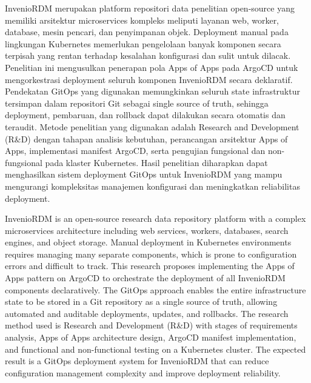 \documentclass[proposal,indonesia]{ugmskripsi}
\begin{document}
\cover
\titlepageind
\approvalpage

\tableofcontents

\abstractind
InvenioRDM merupakan platform repositori data penelitian open-source yang memiliki arsitektur microservices kompleks meliputi layanan web, worker, database, mesin pencari, dan penyimpanan objek. Deployment manual pada lingkungan Kubernetes memerlukan pengelolaan banyak komponen secara terpisah yang rentan terhadap kesalahan konfigurasi dan sulit untuk dilacak. Penelitian ini mengusulkan penerapan pola Apps of Apps pada ArgoCD untuk mengorkestrasi deployment seluruh komponen InvenioRDM secara deklaratif. Pendekatan GitOps yang digunakan memungkinkan seluruh state infrastruktur tersimpan dalam repositori Git sebagai single source of truth, sehingga deployment, pembaruan, dan rollback dapat dilakukan secara otomatis dan teraudit. Metode penelitian yang digunakan adalah Research and Development (R\&D) dengan tahapan analisis kebutuhan, perancangan arsitektur Apps of Apps, implementasi manifest ArgoCD, serta pengujian fungsional dan non-fungsional pada klaster Kubernetes. Hasil penelitian diharapkan dapat menghasilkan sistem deployment GitOps untuk InvenioRDM yang mampu mengurangi kompleksitas manajemen konfigurasi dan meningkatkan reliabilitas deployment.
\endabstractind

\abstracteng
InvenioRDM is an open-source research data repository platform with a complex microservices architecture including web services, workers, databases, search engines, and object storage. Manual deployment in Kubernetes environments requires managing many separate components, which is prone to configuration errors and difficult to track. This research proposes implementing the Apps of Apps pattern on ArgoCD to orchestrate the deployment of all InvenioRDM components declaratively. The GitOps approach enables the entire infrastructure state to be stored in a Git repository as a single source of truth, allowing automated and auditable deployments, updates, and rollbacks. The research method used is Research and Development (R\&D) with stages of requirements analysis, Apps of Apps architecture design, ArgoCD manifest implementation, and functional and non-functional testing on a Kubernetes cluster. The expected result is a GitOps deployment system for InvenioRDM that can reduce configuration management complexity and improve deployment reliability.
\endabstracteng







\end{document}
